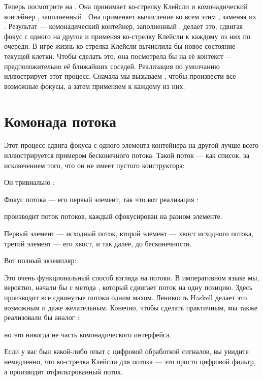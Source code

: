 Теперь посмотрите на . Она принимает ко-стрелку Клейсли и комонадический
контейнер , заполненный . Она применяет
вычисление ко всем этим , заменяя их
. Результат --- комонадический контейнер, заполненный
.  делает это, сдвигая фокус с одного
 на другое и применяя ко-стрелку Клейсли к каждому из них
по очереди. В игре жизнь ко-стрелка Клейсли вычислила бы
новое состояние текущей клетки. Чтобы сделать это, она посмотрела бы на её контекст
--- предположительно её ближайших соседей. Реализация по умолчанию
 иллюстрирует этот процесс. Сначала мы вызываем
, чтобы произвести все возможные фокусы, а затем применяем
 к каждому из них.

\section{Комонада потока}

Этот процесс сдвига фокуса с одного элемента контейнера на
другой лучше всего иллюстрируется примером бесконечного потока. Такой
поток --- как список, за исключением того, что он не имеет пустого
конструктора:

Он тривиально :

Фокус потока --- его первый элемент, так что вот реализация
:

 производит поток потоков, каждый сфокусирован на
разном элементе.

Первый элемент --- исходный поток, второй элемент --- хвост
исходного потока, третий элемент --- его хвост, и так далее, до
бесконечности.

Вот полный экземпляр:

Это очень функциональный способ взгляда на потоки. В императивном
языке мы, вероятно, начали бы с метода , который
сдвигает поток на одну позицию. Здесь  производит все
сдвинутые потоки одним махом. Ленивость Haskell делает это
возможным и даже желательным. Конечно, чтобы сделать 
практичным, мы также реализовали бы аналог :

но это никогда не часть комонадического интерфейса.

Если у вас был какой-либо опыт с цифровой обработкой сигналов, вы увидите
немедленно, что ко-стрелка Клейсли для потока --- это просто цифровой
фильтр, а  производит отфильтрованный поток.


